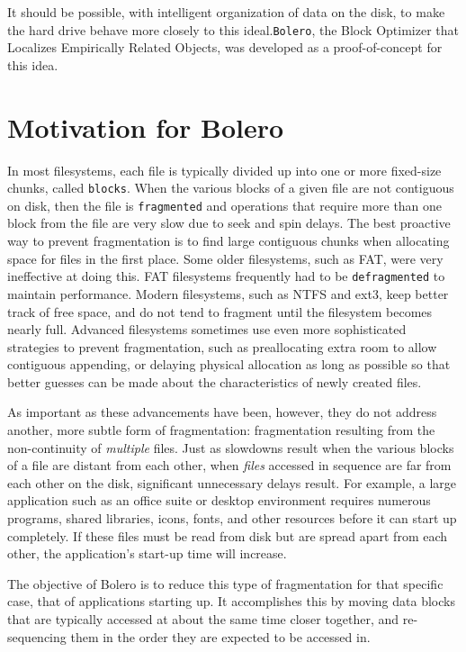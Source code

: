 \documentclass[10pt,twocolumn]{article}
\begin{document}
It should be possible, with intelligent organization of data on the disk, to make the hard drive behave
more closely to this ideal.\texttt{Bolero}, the Block Optimizer that Localizes Empirically Related Objects, was developed as a proof-of-concept for this idea.

\section{Motivation for Bolero}\label{sec:motive}

In most filesystems, each file is typically divided up
into one or more fixed-size chunks, called \texttt{blocks}. When the various blocks
of a given file are not contiguous on disk, then the file is \texttt{fragmented}
and operations that require more than one block from the file are very slow due to
seek and spin delays. The best proactive way to prevent fragmentation is to find large contiguous
chunks when allocating space for files in the first place. Some older filesystems, such as FAT, were
very ineffective at doing this\cite{fathistory}.
FAT filesystems frequently had to be \texttt{defragmented} to maintain performance.
Modern filesystems, such as NTFS and ext3, keep better track of free space,
and do not tend to fragment until the filesystem becomes nearly full. Advanced filesystems sometimes
use even more sophisticated strategies to prevent fragmentation, such as preallocating extra room to allow 
contiguous appending, or delaying physical allocation as long as possible so that better guesses
can be made about the characteristics of newly created files\cite{xfs}.

As important as these advancements have been, however, they do not address another, more subtle form of fragmentation: fragmentation resulting from the non-continuity of \emph{multiple} files.
Just as slowdowns result when the various blocks of a file are distant from each other, when \emph{files} accessed in sequence are far from each other on the disk, significant unnecessary delays result. For example, a large application such as an office suite or desktop environment requires numerous programs, shared libraries, icons, fonts, and other resources before it can start up completely. If these files must be read from disk but are spread apart from each other, the application's start-up time will increase.

The objective of Bolero is to reduce this type of fragmentation for that specific case, that of applications
starting up. It accomplishes this by moving data blocks that are typically accessed at about the same time closer together, and re-sequencing them in the order they are expected to be accessed in.
\end{document}
